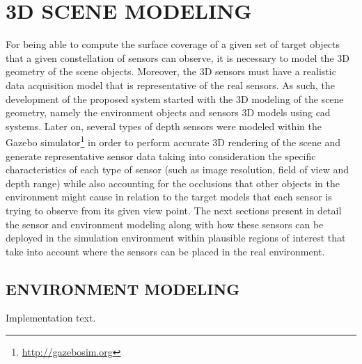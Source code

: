 \section{\uppercase{3D scene modeling}}\label{sec:modeling}

\noindent For being able to compute the surface coverage of a given set of target objects that a given constellation of sensors can observe, it is necessary to model the 3D geometry of the scene objects. Moreover, the 3D sensors must have a realistic data acquisition model that is representative of the real sensors. As such, the development of the proposed system started with the 3D modeling of the scene geometry, namely the environment objects and sensors 3D models using \gls{cad} systems. Later on, several types of depth sensors were modeled within the Gazebo simulator\footnote{\url{http://gazebosim.org}} in order to perform accurate 3D rendering of the scene and generate representative sensor data taking into consideration the specific characteristics of each type of sensor (such as image resolution, field of view and depth range) while also accounting for the occlusions that other objects in the environment might cause in relation to the target models that each sensor is trying to observe from its given view point. The next sections present in detail the sensor and environment modeling along with how these sensors can be deployed in the simulation environment within plausible regions of interest that take into account where the sensors can be placed in the real environment.


\subsection{\uppercase{Environment modeling}}

Implementation text.

